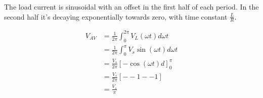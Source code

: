 \subsection{}


\begin{center}
       
    \vspace{2cm} \\
       
\end{center}

The load current is sinusoidal with an offset in the first half of each period.
In the second half it's decaying exponentially towards zero, with time constant $\frac{L}{R}$.


\begin{align*}
V_{AV} & = \frac{1}{2\pi} \int_0^{2\pi} V_L(\omega{}t) d \omega t \\
       & = \frac{1}{2\pi} \int_0^{\pi} V_s\sin(\omega{}t) d \omega t \\
       & = \frac{V_s}{2\pi} \left[ -\cos(\omega{}t) d \right]_0^{\pi} \\   
       & = \frac{V_s}{2\pi} \left[ --1 --1 \right] \\   
       & = \frac{V_s}{\pi} \\
\end{align*}